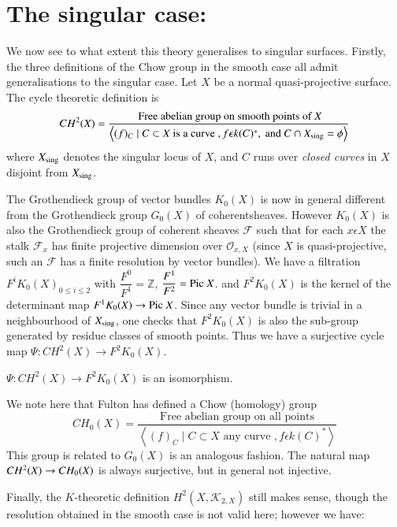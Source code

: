 \section{The singular case:}\label{s2}

We now see to what extent this theory generalises to singular surfaces. Firstly, the three definitions of the Chow group in the smooth case all admit generalisations to the singular case. Let $X$ be a normal quasi-projective surface. The cycle theoretic definition is 
$$
CH^{2}(X)=\dfrac{\text{ Free abelian group on smooth points of } X}{\left<(f)_C\mid C\subset X \text{ is a curve }, f\epsilon k(C)^{\ast}, \text{ and } C\cap X_{\mathrm{sing}}=\phi\right>}
$$
where $X_{\mathrm{sing}}$ denotes the singular locus of $X$, and $C$ runs over \textit{closed curves} in $X$ disjoint from $X_{\mathrm{sing}}$. 

The Grothendieck group of vector bundles $K_0(X)$ is now in general different from the Grothendieck group $G_0(X)$ of coherent\pageoriginale sheaves. However $K_0(X)$ is also the Grothendieck group of coherent sheaves $\mathscr{F}$ such that for each $x\epsilon X$ the stalk $\mathscr{F}_x$ has finite projective dimension over $\mathscr{O}_{x,X}$ (since $X$ is quasi-projective, such an $\mathscr{F}$ has a finite resolution by vector bundles). We have a filtration $F^{i}K_0(X)_{0\leq i\leq 2}$ with $\dfrac{F^{0}}{F^{1}}=\mathbb{Z}$, $\dfrac{F^{1}}{F^{2}}= \mathrm{Pic}\ X$. and $F^{2}K_0(X)$ is the kernel of the determinant map $F^{1}K_0(X)\to \mathrm{Pic}\ X$. Since any vector bundle is trivial in a neighbourhood of $X_{\mathrm{sing}}$, one checks that $F^{2}K_0(X)$ is also the sub-group generated by residue classes of smooth points. Thus we have a surjective cycle map $\Psi:CH^{2}(X)\to F^{2}K_0(X)$. 

\begin{thm}
$\Psi:CH^{2}(X)\to F^{2}K_0(X)$ is an isomorphism. 
\end{thm}

We note here that Fulton has defined a Chow (homology) group 
$$
CH_0(X)=
\dfrac{\text{ Free abelian group on all points }}{\left<(f)_C\mid C\subset X \text{ any curve }, f\epsilon k(C)^{\ast}\right>}
$$
This group is related to $G_0(X)$ is an analogous fashion. The natural
map $CH^{2}(X)\to CH_0(X)$ is always surjective, but in general not injective. 

Finally, the $K$-theoretic definition $H^{2}(X,\mathscr{K}_{2, X})$ still makes sense, though the resolution obtained in the smooth case is not valid here; however we have: 

